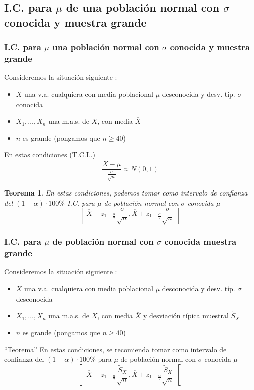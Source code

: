 \documentclass[12pt,t]{beamer}
\renewcommand{\emph}[1]{{\color{red}#1}}
\renewcommand{\geq}{\geqslant}
\theoremstyle{plain}
\newtheorem{teorema}{Teorema}
\theoremstyle{definition}
\begin{document}
\subsection{I.C. para $\mu$ de una población normal con $\sigma$ conocida y  muestra grande}

\begin{frame}
\frametitle{I.C. para $\mu$ una población normal con $\sigma$ conocida y  muestra grande}

Consideremos la situación siguiente  :
\begin{itemize}
\item  $X$ una v.a.  \emph{cualquiera} con media   poblacional $\mu$ desconocida y desv. típ. $\sigma$ conocida

\item $X_1,\ldots,X_n$ una m.a.s. de $X$, con media   $\overline{X}$

\item \emph{$n$ es grande} (pongamos que $n\geq 40$)
\end{itemize}


En estas  condiciones (T.C.L.)
$$
\frac{\overline{X}-\mu}{\frac{\sigma}{\sqrt{n}}}\approx N(0,1)
$$


\begin{teorema}
En estas  condiciones, podemos tomar como intervalo  de confianza  del $(1-\alpha)\cdot 100\%$ I.C. para $\mu$ de población normal con $\sigma$ conocida $\mu$
$$
\left]\overline{X}-z_{1-\frac{\alpha}{2}}\frac{\sigma}{\sqrt{n}},
    \overline{X}+z_{1-\frac{\alpha}{2}}\frac{\sigma}{\sqrt{n}}\right[
$$
\end{teorema}
\end{frame}


\begin{frame}
\frametitle{I.C. para $\mu$ de población normal con $\sigma$ conocida muestra grande}

Consideremos  la situación siguiente  :
\begin{itemize}
\item  $X$ una v.a.  \emph{cualquiera} con media   poblacional $\mu$ desconocida  \emph{y desv. típ. $\sigma$ desconocida}

\item $X_1,\ldots,X_n$ una m.a.s. de $X$, con media   $\overline{X}$ \emph{y desviación típica muestral $\widetilde{S}_X$}

\item \emph{$n$ es grande} (pongamos que $n\geq 40$)
\end{itemize}


\begin{block}{``Teorema''}
En estas  condiciones, se recomienda tomar como  intervalo  de
confianza  del $(1-\alpha)\cdot 100\%$  para $\mu$ de población normal con $\sigma$ conocida $\mu$
$$
\left]\overline{X}-z_{1-\frac{\alpha}{2}}\frac{\widetilde{S}_X}{\sqrt{n}},
    \overline{X}+z_{1-\frac{\alpha}{2}}\frac{\widetilde{S}_X}{\sqrt{n}}\right[
$$
\end{block}



\end{frame}
\end{document}
